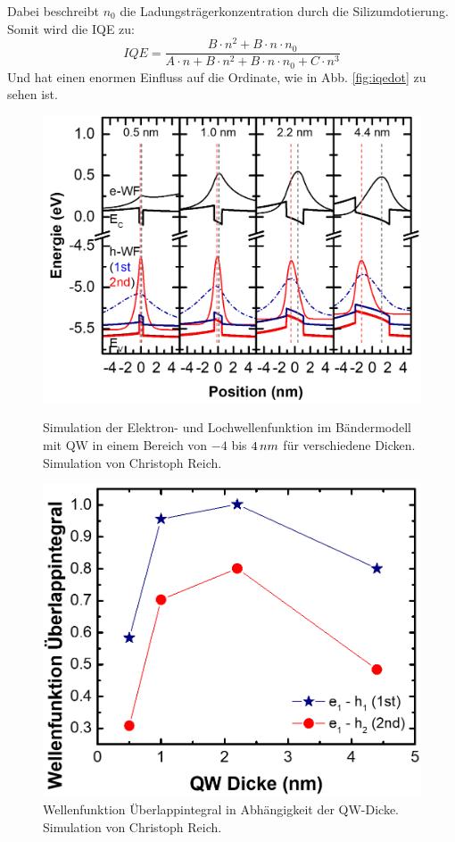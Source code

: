 Dabei beschreibt $n_{0}$ die Ladungsträgerkonzentration durch die Silizumdotierung. 
Somit wird die IQE zu:
\begin{equation}
    IQE = \frac{B \cdot n^2 + B \cdot n \cdot n_{0}}{A \cdot n + B \cdot n^2  + B \cdot n \cdot n_{0}+ C \cdot n^3} 
    \label{eq:dopediqe}
\end{equation}
Und hat einen enormen Einfluss auf die Ordinate, wie in Abb. \ref{fig:iqedot} zu sehen ist.

\begin{figure}[H]
  \centering
  \begin{minipage}[t]{0.49\textwidth}
    \centering
    \includegraphics[width=\textwidth]{Bilder/MQWdickenSerie/Simu1.png}
		\caption{Simulation der Elektron- und Lochwellenfunktion im Bändermodell mit QW in einem Bereich von $-4$ bis $4 \thinspace nm$ für verschiedene Dicken. Simulation von Christoph Reich.}
    \label{fig:undotiertSpektrum}
  \end{minipage}
	\hfill
  \begin{minipage}[t]{0.49\textwidth}
    \centering
    \includegraphics[width=\linewidth]{Bilder/MQWdickenSerie/Simu2.png}
		\caption{Wellenfunktion Überlappintegral in Abhängigkeit der QW-Dicke. Simulation von Christoph Reich.}
    \label{fig:dotiertSpektrum}
  \end{minipage}
\end{figure}

